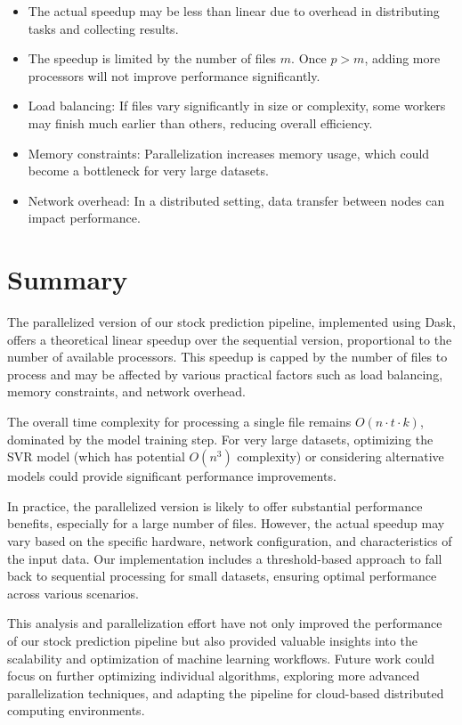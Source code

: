 \documentclass[11pt,a4paper]{article}
\begin{document}
\begin{itemize}
    \item The actual speedup may be less than linear due to overhead in distributing tasks and collecting results.
    \item The speedup is limited by the number of files $m$. Once $p > m$, adding more processors will not improve performance significantly.
    \item Load balancing: If files vary significantly in size or complexity, some workers may finish much earlier than others, reducing overall efficiency.
    \item Memory constraints: Parallelization increases memory usage, which could become a bottleneck for very large datasets.
    \item Network overhead: In a distributed setting, data transfer between nodes can impact performance.
\end{itemize}

\section{Summary}
The parallelized version of our stock prediction pipeline, implemented using Dask, offers a theoretical linear speedup over the sequential version, proportional to the number of available processors. This speedup is capped by the number of files to process and may be affected by various practical factors such as load balancing, memory constraints, and network overhead.

The overall time complexity for processing a single file remains $O(n \cdot t \cdot k)$, dominated by the model training step. For very large datasets, optimizing the SVR model (which has potential $O(n^3)$ complexity) or considering alternative models could provide significant performance improvements.

In practice, the parallelized version is likely to offer substantial performance benefits, especially for a large number of files. However, the actual speedup may vary based on the specific hardware, network configuration, and characteristics of the input data. Our implementation includes a threshold-based approach to fall back to sequential processing for small datasets, ensuring optimal performance across various scenarios.

This analysis and parallelization effort have not only improved the performance of our stock prediction pipeline but also provided valuable insights into the scalability and optimization of machine learning workflows. Future work could focus on further optimizing individual algorithms, exploring more advanced parallelization techniques, and adapting the pipeline for cloud-based distributed computing environments.
\end{document}
